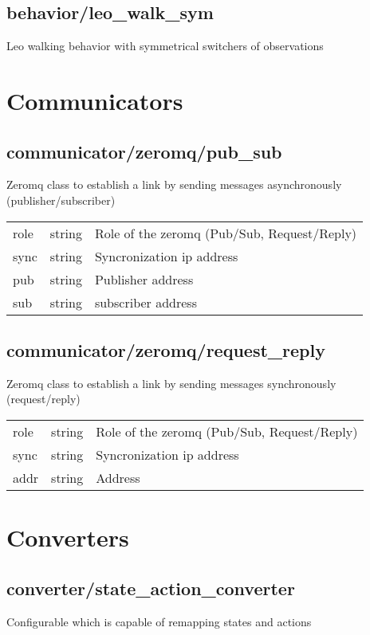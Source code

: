 \subsection{behavior/leo\_walk\_sym}
\noindent Leo walking behavior with symmetrical switchers of observations\\

\section{Communicators}
\subsection{communicator/zeromq/pub\_sub}
\noindent Zeromq class to establish a link by sending messages asynchronously (publisher/subscriber)\\

\noindent\begin{tabular}{@{}lll@{}}
role&string&Role of the zeromq (Pub/Sub, Request/Reply)\\
sync&string&Syncronization ip address\\
pub&string&Publisher address\\
sub&string&subscriber address\\
\end{tabular}
\subsection{communicator/zeromq/request\_reply}
\noindent Zeromq class to establish a link by sending messages synchronously (request/reply)\\

\noindent\begin{tabular}{@{}lll@{}}
role&string&Role of the zeromq (Pub/Sub, Request/Reply)\\
sync&string&Syncronization ip address\\
addr&string&Address\\
\end{tabular}
\section{Converters}
\subsection{converter/state\_action\_converter}
\noindent Configurable which is capable of remapping states and actions\\

